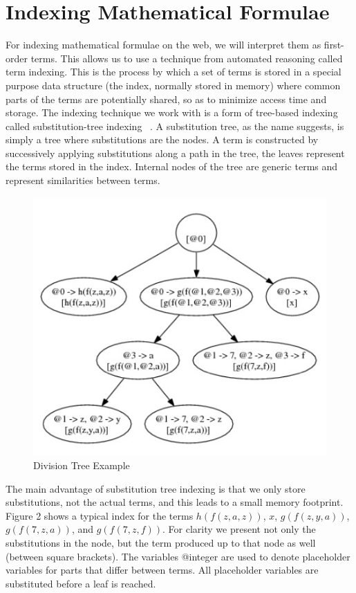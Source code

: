 \documentclass{deliverablereport}
\begin{document}
\section{Indexing Mathematical Formulae}\label{sec:mathindex}

For indexing mathematical formulae on the web, we will interpret them as first-order
terms. This allows us to use a technique from automated reasoning called term
indexing. This is the process by which a set of terms is stored in a special purpose data
structure (the index, normally stored in memory) where common parts of the terms are
potentially shared, so as to minimize access time and storage. The indexing technique we
work with is a form of tree-based indexing called substitution-tree indexing ~\cite{KohSuc:asemf06}. A
substitution tree, as the name suggests, is simply a tree where substitutions are the
nodes. A term is constructed by successively applying substitutions along a path in the
tree, the leaves represent the terms stored in the index. Internal nodes of the tree are
generic terms and represent similarities between terms.

\begin{figure}[h]
\centering
 \includegraphics[scale=0.9]{figure1.jpg}
 \caption{Division Tree Example}
\end{figure}

The main advantage of substitution tree indexing is that we only store substitutions, not
the actual terms, and this leads to a small memory footprint. Figure 2 shows a typical
index for the terms $h(f(z, a, z))$, $x$, $g(f(z, y, a))$, $g(f(7, z, a))$, and
$g(f(7, z, f))$. For clarity we present not only the substitutions in the node, but the
term produced up to that node as well (between square brackets). The variables @integer
are used to denote placeholder variables for parts that differ between terms. All
placeholder variables are substituted before a leaf is reached.
\end{document}
